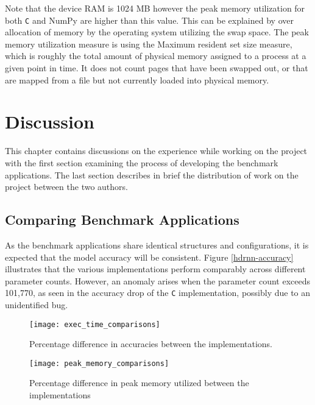 Note that the device RAM is 1024 MB however the peak memory utilization for both \texttt{C} and NumPy are higher than this value. This can be explained by over allocation of memory by the operating system utilizing the swap space. The peak memory utilization measure is using the Maximum resident set size measure, which is roughly the total amount of physical memory assigned to a process at a given point in time. It does not count pages that have been swapped out, or that are mapped from a file but not currently loaded into physical memory.


\chapter{Discussion}

This chapter contains discussions on the experience while working on the project with the first section examining the process of developing the benchmark applications. The last section describes in brief the distribution of work on the project between the two authors.


\section{Comparing Benchmark Applications}

As the benchmark applications share identical structures and configurations, it is expected that the model accuracy will be consistent. Figure \ref{hdrnn-accuracy} illustrates that the various implementations perform comparably across different parameter counts. However, an anomaly arises when the parameter count exceeds 101,770, as seen in the accuracy drop of the \texttt{C} implementation, possibly due to an unidentified bug.

\begin{figure}[!ht]
	\centering
	\texttt{[image: exec\_time\_comparisons]}
	\caption[Execution Time vs Model Parameters]{Percentage difference in accuracies between the implementations.}
	\label{fig:comparison-exec-time}
\end{figure}

\begin{figure}[ht]
	\centering
	\texttt{[image: peak\_memory\_comparisons]}
	\caption[Peak Memory Utilisation]{Percentage difference in peak memory utilized between the implementations}
	\label{fig:comparison-peak-memory}
\end{figure}

